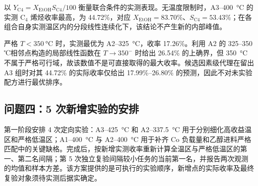 以 $Y_{\mathrm{C4}}=X_{\mathrm{EtOH}}S_{\mathrm{C4}}/100$ 衡量联合条件的实测表现。无温度限制时，A3--\SI{400}{\degreeCelsius} 的实测 $\mathrm{C}_4$ 烯烃收率最高，为 44.72\%，对应 $X_{\mathrm{EtOH}}=83.70\%$、$S_{\mathrm{C4}}=53.43\%$；在各组合自身实测温区内的分段线性连续化下，该结论不产生新的内部峰值。

严格 $T<\SI{350}{\degreeCelsius}$ 时，实测最优为 A2--\SI{325}{\degreeCelsius}，收率 17.26\%。利用 A2 的 325--350 ℃相邻点构造的局部线性函数在 $T\to350^{-}$ 时给出 26.54\% 的上确界，但 \SI{350}{\degreeCelsius} 不属于严格可行域，故该数值不是可直接取得的最大收率。候选因素级代理在留出 A3 组时对其 44.72\% 的实际收率仅给出 17.99\%--26.80\% 的预测，因此不对未实验配方进行最优排序。

\subsection{问题四：5 次新增实验的安排}

第一阶段安排 4 次定向实验：A3--\SI{425}{\degreeCelsius} 和 A2--\SI{337.5}{\degreeCelsius} 用于分别细化高收益温区和严格低温区；A1--\SI{400}{\degreeCelsius} 与 A2--\SI{400}{\degreeCelsius} 用于补齐 Co 负载量和乙醇进料严格匹配中的关键缺格。完成后，按新增实测收率重新计算全温区与严格低温区的第一、第二名间隔；第 5 次独立复验间隔较小任务的当前第一名，并报告两次观测的均值和样本方差。该方案提供的是可执行的实验顺序，新增点的实际收率及最终复验对象须待实测后据实确定。

